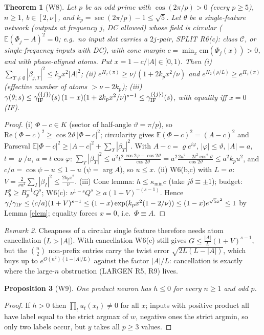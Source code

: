 \documentclass[11pt]{article}
\newtheorem{theorem}{Theorem}\newtheorem{lemma}[theorem]{Lemma}\newtheorem{corollary}[theorem]{Corollary}
\newtheorem{proposition}[theorem]{Proposition}
\theoremstyle{remark}\newtheorem{remark}[theorem]{Remark}
\begin{document}
\begin{theorem}[W8]\label{W8}
Let $p$ be an odd prime with $\cos(2\pi/p)>0$ (every $p\ge5$), $n\ge1$, $b\in[2,\nu]$, and $k_p=\sec(2\pi/p)-1\le\sqrt5$. Let $\theta$ be a
single-feature network (outputs at frequency $j$, DC allowed) whose field is circular ($\mathbb E(\Phi_j-A)^2=0$; e.g.\ no input slot carries
a $2j$-pair, SPLIT R6(c): class $\mathcal C$, or single-frequency inputs with DC), with cone margin $c=\min_x\mathrm{cm}(\Phi_j(x))>0$, and with
phase-aligned atoms. Put $x=1-c/|A|\in[0,1)$. Then
(i) $\sum_{T\ne\emptyset}|\beta_{j,T}|^2\le k_px^2|A|^2$;
(ii) $e^{H_2(\pi)}\ge\nu/(1+2k_px^2/\nu)$ and $e^{H_2(\rho/L)}\ge e^{H_2(\pi)}$ (effective number of atoms $>\nu-2k_p$);
(iii) $\gamma(\theta;s)\le\gamma^{(\{j\})}_{\rm IF}(s)\,(1-x)(1+2k_px^2/\nu)^{s-1}\le\gamma^{(\{j\})}_{\rm IF}(s)$, with equality iff $x=0$ (IF).
\end{theorem}
\begin{proof}
(i) $\Phi-c\in K$ (sector of half-angle $\vartheta=\pi/p$), so $\mathrm{Re}(\Phi-c)^2\ge\cos2\vartheta\,|\Phi-c|^2$; circularity gives
$\mathbb E(\Phi-c)^2=(A-c)^2$ and Parseval $\mathbb E|\Phi-c|^2\ge|A-c|^2+\sum_T|\beta_T|^2$. With $A-c=\varrho e^{i\varphi}$, $|\varphi|\le\vartheta$,
$|A|=a$, $t=\varrho/a$, $u=t\cos\varphi$: $\sum_T|\beta_T|^2\le a^2t^2\frac{\cos2\varphi-\cos2\vartheta}{\cos2\vartheta}
=a^2\frac{2u^2-2t^2\cos^2\vartheta}{\cos2\vartheta}\le a^2k_pu^2$, and $c/a=\cos\psi-u\le1-u$ ($\psi=\arg A$), so $u\le x$.
(ii) W6(b,c) with $L=a$: $V=\frac2{\nu a^2}\sum_I|\beta_I|^2\le\frac{2k_px^2}\nu$.
(iii) Cone lemma: $h\le\kappa_{\min}c$ (take $j\delta\equiv\pm1$); budget: $P_b^s\ge B_p^{-1}Q^s$; W6(c): $\nu^{1-s}Q^s\ge a(1+V)^{-(s-1)}$.
Hence $\gamma/\gamma_{\rm IF}\le(c/a)(1+V)^{s-1}\le(1-x)\exp(k_px^2(1-2/\nu))\le(1-x)e^{\sqrt5x^2}\le1$ by Lemma \ref{elem};
equality forces $x=0$, i.e.\ $\Phi\equiv A$.
\end{proof}
\begin{remark}Cheapness of a circular single feature therefore needs atom cancellation ($L>|A|$). With cancellation W6(c) still gives
$G\le\frac{|A|}{L}(1+V)^{s-1}$, but the $\binom n2$ non-prefix entries carry the twist error $\sqrt{2L(L-|A|)}$, which buys up to
$e^{O(n^2)(1-|A|/L)}$ against the factor $|A|/L$: cancellation is exactly where the large-$n$ obstruction (LARGEN R5, R9) lives.\end{remark}

\begin{proposition}[W9]One product neuron has $h\le0$ for every $n\ge1$ and odd $p$.\end{proposition}
\begin{proof}If $h>0$ then $\prod_tu_t(x_t)\ne0$ for all $x$; inputs with positive product all have label equal to the strict
argmax of $w$, negative ones the strict argmin, so only two labels occur, but $y$ takes all $p\ge3$ values.\end{proof}
\end{document}
